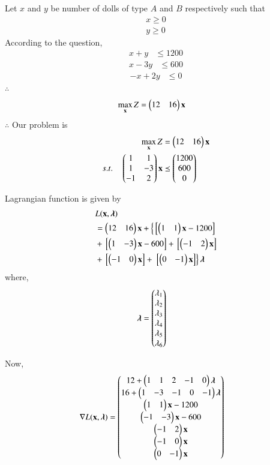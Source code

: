 
Let $x$ and $y$ be number of dolls of type $A$ and $B$ respectively such that 
\begin{align}
    x \geq 0 \\
    y \geq 0 
\end{align}
According to the question,
\begin{align}
    x+y &\leq 1200 
\end{align}
\begin{align}
   x-3y &\leq 600 
\end{align}
\begin{align}
-x+2y&\leq 0
\end{align}
$\therefore$ 
\begin{align}
        \max_{\mathbf{x}} Z &= \begin{pmatrix}12 & 16\end{pmatrix}\mathbf{x}
\end{align}
$\therefore$ Our problem is
\begin{align}
        \max_{\mathbf{x}} Z &= \begin{pmatrix}12 & 16\end{pmatrix}\mathbf{x}\\
        s.t. \quad 
        \begin{pmatrix}1 & 1 \\ 1 & -3 \\ -1 & 2 \end{pmatrix}\mathbf{x} &\preceq \begin{pmatrix}1200\\600\\0\end{pmatrix}
\end{align}

Lagrangian function is given by
\begin{equation}
\begin{aligned}
    &L(\mathbf{x},\boldsymbol{\lambda}) \\ &= \begin{pmatrix}12 & 16\end{pmatrix}\mathbf{x}+\left\{{}\left[\begin{pmatrix}1 & 1\end{pmatrix}\mathbf{x}-1200\right]\right. \\ &+ {}\left[\begin{pmatrix}1 & -3\end{pmatrix}\mathbf{x}-600\right] +{}\left[\begin{pmatrix}-1 & 2\end{pmatrix}\mathbf{x}\right] \\ &+ {}\left[\begin{pmatrix}-1 & 0\end{pmatrix}\mathbf{x}\right] +\left.{}\left[\begin{pmatrix}0 & -1\end{pmatrix}\mathbf{x}\right]\right\}\boldsymbol{\lambda}
\end{aligned}
\end{equation}
where,
\begin{align}
    \boldsymbol{\lambda} &= \begin{pmatrix}\lambda_1 \\ \lambda_2 \\ \lambda_3 \\ \lambda_4 \\ \lambda_5 \\ \lambda_6\end{pmatrix}
\end{align}

Now,
\begin{align}
    \nabla L(\mathbf{x},\boldsymbol{\lambda}) &= \begin{pmatrix}12+ \begin{pmatrix}1 & 1 & 2 & -1 & 0 \end{pmatrix}\boldsymbol{\lambda}\\ 16+\begin{pmatrix}1 & -3 & -1 & 0 & -1\end{pmatrix}\boldsymbol{\lambda} \\ \begin{pmatrix}1 & 1\end{pmatrix}\mathbf{x}-1200 \\ \begin{pmatrix}-1 & -3\end{pmatrix}\mathbf{x}-600 \\ \begin{pmatrix}-1 & 2\end{pmatrix}\mathbf{x}\\ \begin{pmatrix}-1 & 0\end{pmatrix}\mathbf{x} \\ \begin{pmatrix}0 & -1\end{pmatrix}\mathbf{x}\end{pmatrix}
\end{align}

